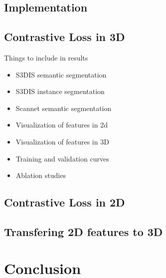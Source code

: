 \documentclass[10pt,twocolumn,letterpaper]{article}
\begin{document}
\subsection{Implementation}
\label{sec:results:implementation}

\subsection{Contrastive Loss in 3D}
\label{sec:results:3d}

Things to include in results
\begin{itemize}
    \item S3DIS semantic segmentation
    \item S3DIS instance segmentation
    \item Scannet semantic segmentation
    \item Visualization of features in 2d
    \item Visualization of features in 3D
    \item Training and validation curves
    \item Ablation studies
\end{itemize}

\subsection{Contrastive Loss in 2D}
\label{sec:results:2d}

\subsection{Transfering 2D features to 3D}
\label{sec:results:2d3d}

\section{Conclusion}
\label{sec:conclusion}


{\small
    
    
}
\end{document}
